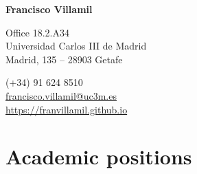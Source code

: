 \documentclass[a4paper, 12pt]{article}
\begin{document}

\begin{center}
{\bfseries\Large Francisco Villamil}
\end{center}

\vspace{0pt}

\noindent
\begin{minipage}[t]{0.47\textwidth}\small
\flushright
	Office 18.2.A34\\
	Universidad Carlos III de Madrid\\
	Madrid, 135 -- 28903 Getafe\\
\end{minipage}\hfill
\begin{minipage}[t]{0.47\textwidth}\small
	 \hspace{5pt} (+34) 91 624 8510\\
	 \hspace{5pt} \href{mailto:francisco.villamil@uc3m.es}{francisco.villamil@uc3m.es}\\
	 \hspace{5pt} \href{https://franvillamil.github.io}{https://franvillamil.github.io}\\
\end{minipage}


\section*{Academic positions}
\end{document}
